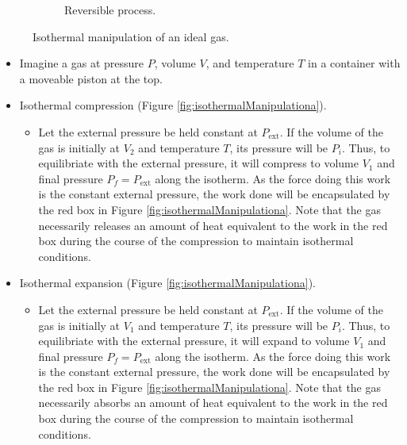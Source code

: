 \documentclass[../notes.tex]{subfiles}
\begin{document}
\begin{itemize}
\begin{figure}[h!]
\begin{subfigure}[b]{0.3\linewidth}
            \caption{Reversible process.}
            \label{fig:isothermalManipulationc}
        \end{subfigure}
        \caption{Isothermal manipulation of an ideal gas.}
        \label{fig:isothermalManipulation}
    \end{figure}
    \begin{itemize}
        \item Imagine a gas at pressure $P$, volume $V$, and temperature $T$ in a container with a moveable piston at the top.
        \item Isothermal compression (Figure \ref{fig:isothermalManipulationa}).
        \begin{itemize}
            \item Let the external pressure be held constant at $P_\text{ext}$. If the volume of the gas is initially at $V_2$ and temperature $T$, its pressure will be $P_i$. Thus, to equilibriate with the external pressure, it will compress to volume $V_1$ and final pressure $P_f=P_\text{ext}$ along the isotherm. As the force doing this work is the constant external pressure, the work done will be encapsulated by the red box in Figure \ref{fig:isothermalManipulationa}. Note that the gas necessarily releases an amount of heat equivalent to the work in the red box during the course of the compression to maintain isothermal conditions.
        \end{itemize}
        \item Isothermal expansion (Figure \ref{fig:isothermalManipulationa}).
        \begin{itemize}
            \item Let the external pressure be held constant at $P_\text{ext}$. If the volume of the gas is initially at $V_1$ and temperature $T$, its pressure will be $P_i$. Thus, to equilibriate with the external pressure, it will expand to volume $V_1$ and final pressure $P_f=P_\text{ext}$ along the isotherm. As the force doing this work is the constant external pressure, the work done will be encapsulated by the red box in Figure \ref{fig:isothermalManipulationa}. Note that the gas necessarily absorbs an amount of heat equivalent to the work in the red box during the course of the compression to maintain isothermal conditions.
        \end{itemize}

\end{itemize}
\end{itemize}
\end{document}
